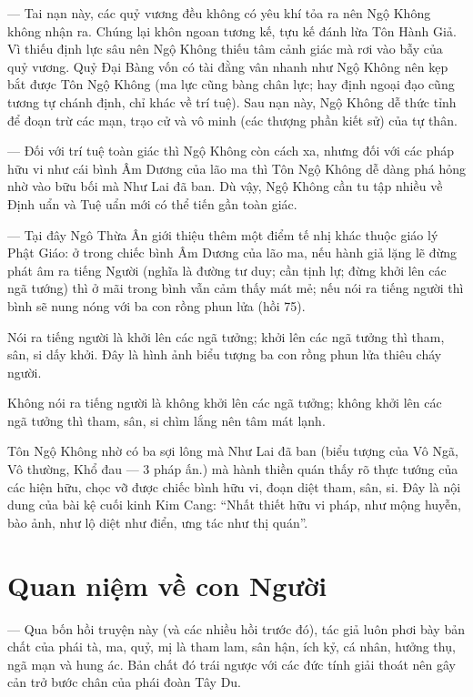 — Tai nạn này, các quỷ vương đều không có yêu khí tỏa ra nên Ngộ Không không nhận ra. Chúng lại khôn ngoan tương kế, tựu kế đánh lừa Tôn Hành Giả. Vì thiếu định lực sâu nên Ngộ Không thiếu tâm cảnh giác mà rơi vào bẫy của quỷ vương. Quỷ Đại Bàng vốn có tài đằng vân nhanh như Ngộ Không nên kẹp bắt được Tôn Ngộ Không (ma lực cũng bàng chân lực; hay định ngoại đạo cũng tương tự chánh định, chỉ khác về trí tuệ). Sau nạn này, Ngộ Không dễ thức tỉnh để đoạn trừ các mạn, trạo cử và vô minh (các thượng phần kiết sử) của tự thân.

— Đối với trí tuệ toàn giác thì Ngộ Không còn cách xa, nhưng đối với các pháp hữu vi như cái bình Âm Dương của lão ma thì Tôn Ngộ Không dễ dàng phá hỏng nhờ vào bữu bối mà Như Lai đã ban. Dù vậy, Ngộ Không cần tu tập nhiều về Định uẩn và Tuệ uẩn mới có thể tiến gần toàn giác.

— Tại đây Ngô Thừa Ân giới thiệu thêm một điểm tế nhị khác thuộc giáo lý Phật Giáo: ở trong chiếc bình Âm Dương của lão ma, nếu hành giả lặng lẽ đừng phát âm ra tiếng Người (nghĩa là đường tư duy; cần tịnh lự; đừng khởi lên các ngã tướng) thì ở mãi trong bình vẫn cảm thấy mát mẻ; nếu nói ra tiếng người thì bình sẽ nung nóng với ba con rồng phun lửa (hồi 75).

Nói ra tiếng người là khởi lên các ngã tưởng; khởi lên các ngã tưởng thì tham, sân, si dấy khởi. Đây là hình ảnh biểu tượng ba con rồng phun lửa thiêu cháy người.

Không nói ra tiếng người là không khởi lên các ngã tưởng; không khởi lên các ngã tưởng thì tham, sân, si chìm lắng nên tâm mát lạnh.

Tôn Ngộ Không nhờ có ba sợi lông mà Như Lai đã ban (biểu tượng của Vô Ngã, Vô thường, Khổ đau — 3 pháp ấn.) mà hành thiền quán thấy rõ thực tướng của các hiện hữu, chọc vỡ được chiếc bình hữu vi, đoạn diệt tham, sân, si. Đây là nội dung của bài kệ cuối kinh Kim Cang: ``Nhất thiết hữu vi pháp, như mộng huyễn, bào ảnh, như lộ diệt như điển, ưng tác như thị quán''.

\section{Quan niệm về con Người} %
\label{sec:74_75_con_nguoi}

— Qua bốn hồi truyện này (và các nhiều hồi trước đó), tác giả luôn phơi bày bản chất của phái tà, ma, quỷ, mị là tham lam, sân hận, ích kỷ, cá nhân, hưởng thụ, ngã mạn và hung ác. Bản chất đó trái ngược với các đức tính giải thoát nên gây cản trở bước chân của phái đoàn Tây Du.

